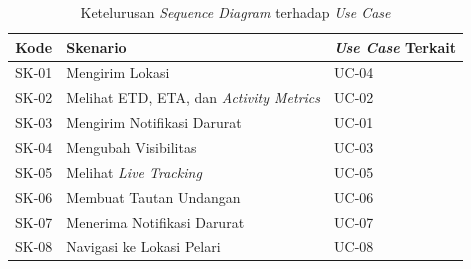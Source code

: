 \begin{table}[H]
\centering
\captionsetup{justification=centering}
\caption{Ketelurusan \textit{Sequence Diagram} terhadap \textit{Use Case}}
\label{tab:ketelurusan-sequence}
\renewcommand{\arraystretch}{1.4}
\begin{tabular}{|c|l|l|}
\hline
\textbf{Kode} & \textbf{Skenario} & \textbf{\textit{Use Case} Terkait} \\
\hline
SK-01 & Mengirim Lokasi & UC-04 \\
\hline
SK-02 & Melihat ETD, ETA, dan \textit{Activity Metrics} & UC-02 \\
\hline
SK-03 & Mengirim Notifikasi Darurat & UC-01 \\
\hline
SK-04 & Mengubah Visibilitas & UC-03 \\
\hline
SK-05 & Melihat \textit{Live Tracking} & UC-05 \\
\hline
SK-06 & Membuat Tautan Undangan & UC-06 \\
\hline
SK-07 & Menerima Notifikasi Darurat & UC-07 \\
\hline
SK-08 & Navigasi ke Lokasi Pelari & UC-08 \\
\hline
\end{tabular}
\end{table}